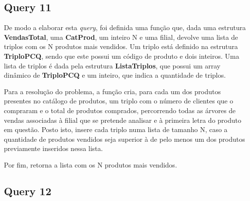 \documentclass{article}
\begin{document}
\subsection{Query 11}


\vspace{1 cm}

\par\noindent\hspace{0.52cm}De modo a elaborar esta \textit{query}, foi definida uma função que, dada uma estrutura \textbf{VendasTotal}, uma \textbf{CatProd}, um inteiro N e uma filial, devolve uma lista de triplos com os N produtos mais vendidos. Um triplo está definido na estrutura \textbf{TriploPCQ}, sendo que este possui um código de produto e dois inteiros. Uma lista de triplos é dada pela estrutura \textbf{ListaTriplos}, que possui um array dinâmico de \textbf{TriploPCQ} e um inteiro, que indica a quantidade de triplos.
\par Para a resolução do problema, a função cria, para cada um dos produtos presentes no catálogo de produtos, um triplo com o número de clientes que o compraram e o total de produtos comprados, percorrendo todas as árvores de vendas associadas à filial que se pretende analisar e à primeira letra do produto em questão. Posto isto, insere cada triplo numa lista de tamanho N, caso a quantidade de produtos vendidos seja superior à de pelo menos um dos produtos previamente inseridos nessa lista.
\par Por fim, retorna a lista com os N produtos mais vendidos.

\subsection{Query 12}


\vspace{1cm}
\end{document}
